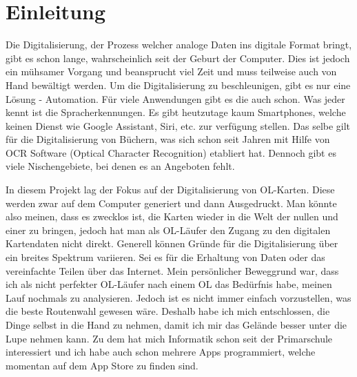 \section{Einleitung}

Die Digitalisierung, der Prozess welcher analoge Daten ins digitale Format bringt, gibt es schon lange, wahrscheinlich seit der Geburt der Computer. Dies ist jedoch ein mühsamer Vorgang und beansprucht viel Zeit und muss teilweise auch von Hand bewältigt werden. Um die Digitalisierung  zu beschleunigen, gibt es nur eine Lösung - Automation. Für viele Anwendungen gibt es die auch schon. Was jeder kennt ist  die Spracherkennungen. Es gibt heutzutage kaum Smartphones, welche keinen Dienst wie Google Assistant, Siri, etc. zur verfügung stellen. Das selbe gilt für die Digitalisierung von Büchern, was sich schon seit Jahren mit Hilfe von OCR Software (Optical Character Recognition) etabliert hat. Dennoch gibt es viele Nischengebiete, bei denen es an Angeboten fehlt.

In diesem Projekt lag der Fokus auf der Digitalisierung von OL-Karten. Diese werden zwar auf dem Computer generiert und dann Ausgedruckt. Man könnte also meinen, dass es zwecklos ist, die Karten wieder in die Welt der nullen und einer zu bringen, jedoch hat man als OL-Läufer den Zugang zu den digitalen Kartendaten nicht direkt. Generell können Gründe für die Digitalisierung über ein breites Spektrum variieren. Sei es für die Erhaltung von Daten oder das vereinfachte Teilen über das Internet. Mein persönlicher Beweggrund war, dass ich als nicht perfekter OL-Läufer nach einem OL das Bedürfnis habe, meinen Lauf nochmals zu analysieren. Jedoch ist es nicht immer einfach vorzustellen, was die beste Routenwahl gewesen wäre. Deshalb habe ich mich entschlossen, die Dinge selbst in die Hand zu nehmen, damit ich mir das Gelände besser unter die Lupe nehmen kann. Zu dem hat mich Informatik schon seit der Primarschule interessiert und ich habe auch schon mehrere Apps programmiert, welche momentan auf dem App Store zu finden sind.